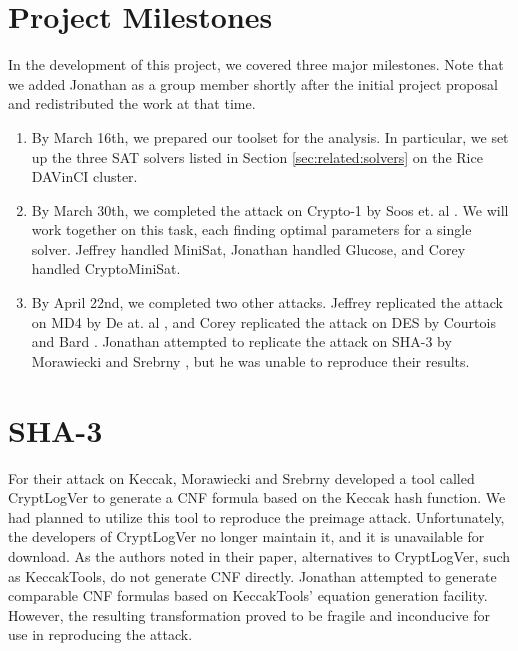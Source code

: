 \appendix
\section{Project Milestones}
\label{sec:milestones}

In the development of this project, we covered three major milestones. Note that we added Jonathan as a group member shortly after the initial project proposal and redistributed the work at that time.
\begin{enumerate}
	\item By March 16th, we prepared our toolset for the analysis. In particular, we set up the three SAT solvers listed in Section \ref{sec:related:solvers} on the Rice DAVinCI cluster.
	
	\item By March 30th, we completed the attack on Crypto-1 by Soos et. al \cite{SNC09}. We will work together on this task, each finding optimal parameters for a single solver. Jeffrey handled MiniSat, Jonathan handled Glucose, and Corey handled CryptoMiniSat.
	
	\item By April 22nd, we completed two other attacks. Jeffrey replicated the attack on MD4 by De at. al \cite{DKV07}, and Corey replicated the attack on DES by Courtois and Bard \cite{CB07}. Jonathan attempted to replicate the attack on SHA-3 by Morawiecki and Srebrny \cite{MS13}, but he was unable to reproduce their results.
\end{enumerate}

\section{SHA-3}
For their attack on Keccak, Morawiecki and Srebrny developed a tool called CryptLogVer to generate a CNF formula based on the Keccak hash function. We had planned to utilize this tool to reproduce the preimage attack. Unfortunately, the developers of CryptLogVer no longer maintain it, and it is unavailable for download. As the authors noted in their paper, alternatives to CryptLogVer, such as KeccakTools, do not generate CNF directly. Jonathan attempted to generate comparable CNF formulas based on KeccakTools' equation generation facility. However, the resulting transformation proved to be fragile and inconducive for use in reproducing the attack.